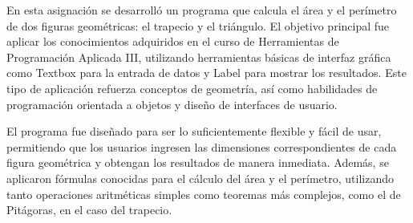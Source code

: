 En esta asignación se desarrolló un programa que calcula el área y el perímetro de dos figuras geométricas: el trapecio y el triángulo. El objetivo principal fue aplicar los conocimientos adquiridos en el curso de Herramientas de Programación Aplicada III, utilizando herramientas básicas de interfaz gráfica como Textbox para la entrada de datos y Label para mostrar los resultados. Este tipo de aplicación refuerza conceptos de geometría, así como habilidades de programación orientada a objetos y diseño de interfaces de usuario.

El programa fue diseñado para ser lo suficientemente flexible y fácil de usar, permitiendo que los usuarios ingresen las dimensiones correspondientes de cada figura geométrica y obtengan los resultados de manera inmediata. Además, se aplicaron fórmulas conocidas para el cálculo del área y el perímetro, utilizando tanto operaciones aritméticas simples como teoremas más complejos, como el de Pitágoras, en el caso del trapecio.